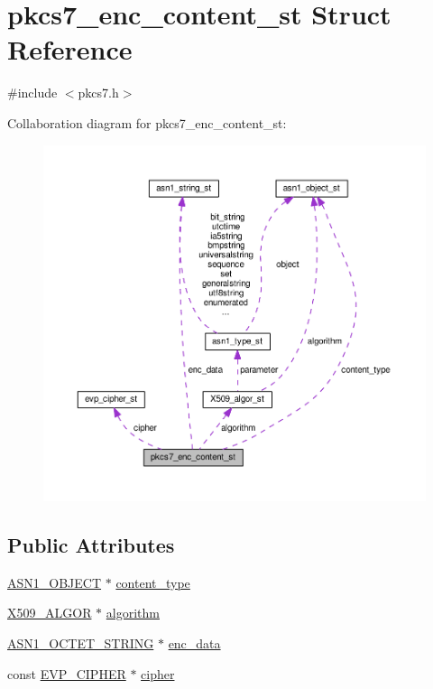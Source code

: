 \hypertarget{structpkcs7__enc__content__st}{}\section{pkcs7\+\_\+enc\+\_\+content\+\_\+st Struct Reference}
\label{structpkcs7__enc__content__st}


{\ttfamily \#include $<$pkcs7.\+h$>$}



Collaboration diagram for pkcs7\+\_\+enc\+\_\+content\+\_\+st\+:
\nopagebreak
\begin{figure}[H]
\begin{center}
\leavevmode
\includegraphics[width=350pt]{structpkcs7__enc__content__st__coll__graph}
\end{center}
\end{figure}
\subsection*{Public Attributes}
\begin{DoxyCompactItemize}
\item 
\hyperlink{asn1_8h_ae10c08e4e6b23f67a39b2add932ec48f}{A\+S\+N1\+\_\+\+O\+B\+J\+E\+CT} $\ast$ \hyperlink{structpkcs7__enc__content__st_aae31932dd3ab5e4b1e54e9915f9c547c}{content\+\_\+type}
\item 
\hyperlink{ossl__typ_8h_aa2b6185e6254f36f709cd6577fb5022e}{X509\+\_\+\+A\+L\+G\+OR} $\ast$ \hyperlink{structpkcs7__enc__content__st_af6c78a84b4ca86334dfc04a072ce1117}{algorithm}
\item 
\hyperlink{ossl__typ_8h_afbd05e94e0f0430a2b729473efec88c1}{A\+S\+N1\+\_\+\+O\+C\+T\+E\+T\+\_\+\+S\+T\+R\+I\+NG} $\ast$ \hyperlink{structpkcs7__enc__content__st_ab4d08c0f1b94885ea0d0380ef4745c7b}{enc\+\_\+data}
\item 
const \hyperlink{ossl__typ_8h_a54a8663a8084d45c31f2786156b55405}{E\+V\+P\+\_\+\+C\+I\+P\+H\+ER} $\ast$ \hyperlink{structpkcs7__enc__content__st_abb4444669fdf67803367ebddf34b8aff}{cipher}
\end{DoxyCompactItemize}


